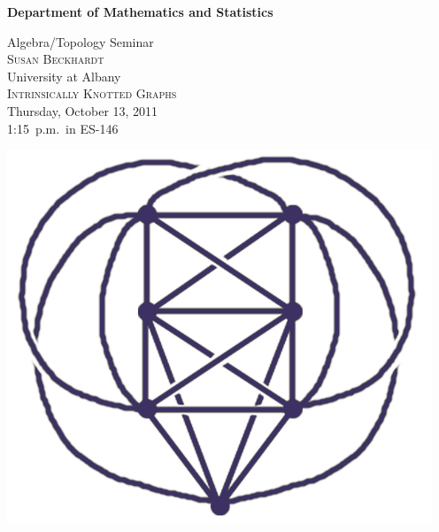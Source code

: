 \documentclass[12pt]{article}
\begin{document}
\noindent\hspace{-28px}%
\hfill\textsf{\textbf{\footnotesize%
Department of Mathematics and Statistics}}\bigskip\bigskip

\begin{center}\Large
  \textsf{{\huge Algebra/Topology Seminar}}\\[2.5\bigskipamount]
  \textsc{Susan Beckhardt}\\
  {\large University at Albany}\\[\bigskipamount]
  \textsc{Intrinsically Knotted Graphs}\\[2\bigskipamount]
  Thursday, October 13, 2011\\ 1:15~p.m.\ in ES-146
\end{center}\bigskip\bigskip

\vfill\noindent\hfil\includegraphics[width=5in]{111013-seminar.jpg}\hfil\vfill
\end{document}
